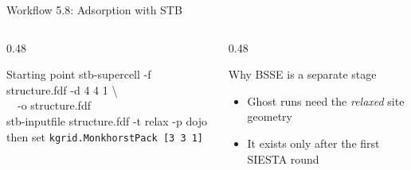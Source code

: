 \documentclass[8pt]{beamer}
\begin{document}
\begin{frame}{Workflow 5.8: Adsorption with STB}
{%
	}
	\vspace{0.3cm}
	\begin{columns}[T]
		\begin{column}{0.48\textwidth}
			\begin{block}{Starting point}
				\ttfamily\scriptsize
				stb-supercell -f structure.fdf -d 4 4 1 \textbackslash\\
				\ \ -o structure.fdf\\
				stb-inputfile structure.fdf -t relax -p dojo\\[2pt]
				\normalfont\scriptsize then set \texttt{kgrid.MonkhorstPack [3 3 1]}
			\end{block}
		\end{column}
		\begin{column}{0.48\textwidth}
			\begin{alertblock}{Why BSSE is a separate stage}
				\small
				\begin{itemize}
					\item Ghost runs need the \emph{relaxed} site geometry
					\item It exists only after the first SIESTA round
				\end{itemize}
			\end{alertblock}
		\end{column}
	\end{columns}
\end{frame}
\end{document}
